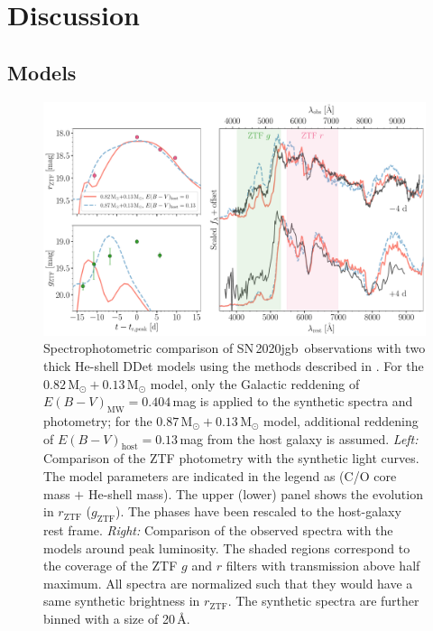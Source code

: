 \documentclass[twocolumn]{aastex631}
\newcommand{\sn}{SN\,2020jgb}
\newcommand{\Msun}{\mathrm{M_\odot}}
\begin{document}
\section{Discussion} \label{sec:discussion}
\subsection{Models} \label{sec:model}
\begin{figure}
    \centering
    \includegraphics[width=\textwidth]{model.pdf}
    \caption{Spectrophotometric comparison of \sn\ observations with two thick He-shell DDet models using the methods described in \citet{polin_observational_2019}. For the $0.82\,\Msun+0.13\,\Msun$ model, only the Galactic reddening of $E(B-V)_\mathrm{MW}=0.404$\,mag is applied to the synthetic spectra and photometry; for the $0.87\,\Msun+0.13\,\Msun$ model, additional reddening of $E(B-V)_\mathrm{host}=0.13$\,mag from the host galaxy is assumed. {\it Left:} Comparison of the ZTF photometry with the synthetic light curves. The model parameters are indicated in the legend as (C/O core mass $+$ He-shell mass). The upper (lower) panel shows the evolution in $r_\mathrm{ZTF}$ ($g_\mathrm{ZTF}$). The phases have been rescaled to the host-galaxy rest frame. {\it Right:} Comparison of the observed spectra with the models around peak luminosity. The shaded regions correspond to the coverage of the ZTF $g$ and $r$ filters with transmission above half maximum. All spectra are normalized such that they would have a same synthetic brightness in $r_\mathrm{ZTF}$. The synthetic spectra are further binned with a size of 20\,\AA.}
    \label{fig:model}
\end{figure}
\end{document}
